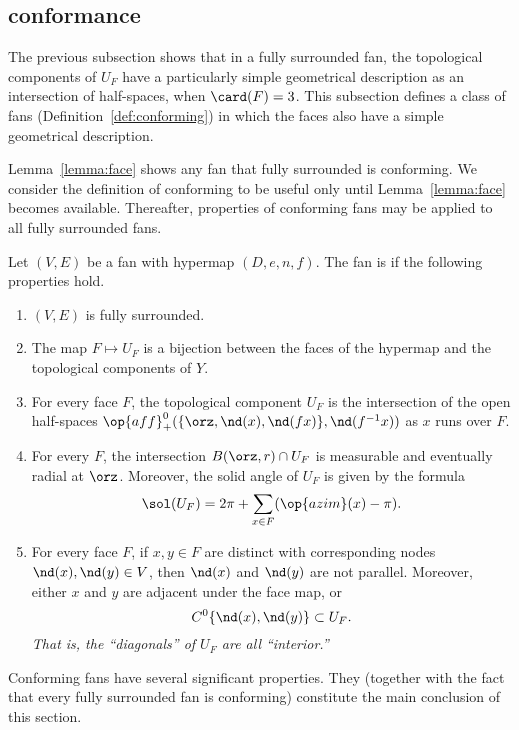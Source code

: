 \subsection{conformance}\label{sec:conformance}


The previous subsection shows that in a fully surrounded fan, the topological
components of $U_F$ have a particularly simple geometrical description as
an intersection of half-spaces, when $\card(F)=3$.  This subsection defines
a class of fans (Definition~\ref{def:conforming}) in which the faces also have
a  simple geometrical description.

Lemma~\ref{lemma:face} shows any fan that fully surrounded is
conforming.  We consider the definition of conforming to be
useful only until Lemma~\ref{lemma:face} becomes available.
Thereafter, properties of conforming fans may be applied to all fully
surrounded fans.

\begin{definition}[conforming]\label{def:conforming}
Let $(V,E)$ be a fan with hypermap $(D,e,n,f)$.  The fan is
 if the following properties hold.
\begin{enumerate}
\item {} $(V,E)$ is fully surrounded.
\item {} The map $F\mapsto U_F$ is a bijection between
the faces of the hypermap and the topological components of $Y$.
\item {} For every face $F$, the topological component
$U_F$ is the intersection of the open half-spaces
$\op{aff}_+^0(\{\orz,\nd(x),\nd({f x})\},\nd(f^{-1} x))$ as $x$ runs over
$F$.\label{halfspace:conformance}
\item {} For every $F$, the intersection
$B(\orz,r)\cap U_F$ is measurable and eventually radial at $\orz$.
Moreover, the solid angle of $U_F$ is given by the formula
\[ 
\sol(U_F) = 2\pi + \sum_{x\in F}(\op{azim}(x)-\pi).
\] 
\item {} For every face $F$, if $x,y\in F$ are distinct
with corresponding nodes $\nd(x),\nd(y)\in V$, then $\nd(x)$ and
$\nd(y)$ are not parallel.  Moreover, either $x$ and $y$ are adjacent under
the face map, or 
\[
C^0\{\nd(x),\nd(y)\}\subset U_F.
\]  
{\it That is, the
``diagonals'' of $U_F$ are all ``interior.''}
\end{enumerate}
\end{definition}


Conforming fans have several significant properties.   They
(together with the fact that every fully surrounded fan is conforming) constitute
the main conclusion of this section.  

